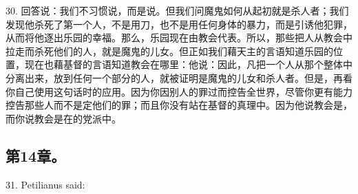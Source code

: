 30. 回答说：我们不习惯说，而是说。但我们问魔鬼如何从起初就是杀人者；我们发现他杀死了第一个人，不是用刀，也不是用任何身体的暴力，而是引诱他犯罪，从而将他逐出乐园的幸福。那么，乐园现在由教会代表。所以，那些把人从教会中拉走而杀死他们的人，就是魔鬼的儿女。但正如我们藉天主的言语知道乐园的位置，现在也藉基督的言语知道教会在哪里：他说：因此，凡把一个人从那个整体中分离出来，放到任何一个部分的人，就被证明是魔鬼的儿女和杀人者。但是，再看你自己使用这句话时的应用。因为你因别人的罪过而控告全世界，尽管你更有能力控告那些人而不是定他们的罪；而且你没有站在基督的真理中。因为他说教会是，而你说教会是在的党派中。\par


\subsection{第14章。}

31. Petilianus said:  \par

